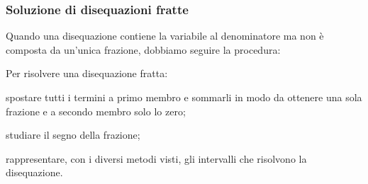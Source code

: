 \subsubsection{Soluzione di disequazioni fratte}

Quando una disequazione contiene la variabile al denominatore ma non è composta
da un'unica frazione, dobbiamo seguire la procedura:

\begin{procedura}
 Per risolvere una disequazione fratta:
\begin{enumeratea}
 \item spostare tutti i termini a primo membro e sommarli in modo da ottenere
 una sola frazione e a secondo membro solo lo zero;
 \item studiare il segno della frazione;
 \item rappresentare, con i diversi metodi visti,
  gli intervalli che risolvono la disequazione.
\end{enumeratea}
\end{procedura}

